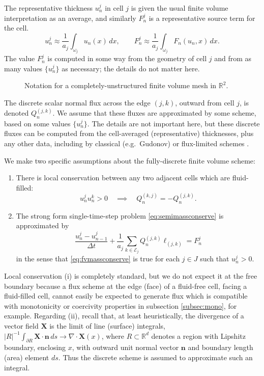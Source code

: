 \documentclass[final,leqno,onefignum,onetabnum]{siamltex1213bueler}
\newcommand\bn{\mathbf{n}}
\newcommand\bX{\mathbf{X}}
\newcommand{\Div}{\nabla\cdot}
\newcommand\RR{\mathbb{R}}
\begin{document}
The representative thickness $u_n^j$ in cell $j$ is given the usual finite volume interpretation as an average, and similarly $F_n^j$ is a representative source term for the cell.
\begin{equation}
u_n^j \approx \frac{1}{a_j} \int_{\omega_j} u_n(x)\,dx, \qquad F_n^j \approx \frac{1}{a_j} \int_{\omega_j} F_n(u_n,x)\,dx.  \label{eq:fvthickness}
\end{equation}
The value $F_n^j$ is computed in some way from the geometry of cell $j$ and from as many values $\{u_n^j\}$ as necessary; the details do not matter here.

\begin{figure}[ht]
\begin{center}

\end{center}
\caption{Notation for a completely-unstructured finite volume mesh in $\RR^2$.}
\label{fig:fvmesh-notation}
\end{figure}

The discrete scalar normal flux across the edge $(j,k)$, outward from cell $j$, is denoted $Q_n^{(j,k)}$.  We assume that these fluxes are approximated by some scheme, based on some values $\{u_n^j\}$.  The details are not important here, but these discrete fluxes can be computed from the cell-averaged (representative) thicknesses, plus any other data, including by classical (e.g.~Gudonov) or flux-limited schemes \cite{LeVeque2002}.

We make two specific assumptions about the fully-discrete finite volume scheme:\begin{enumerate}
\item There is local conservation between any two adjacent cells which are fluid-filled:
\begin{equation}
  u_n^j u_n^k > 0 \quad \implies \quad Q_n^{(k,j)}=-Q_n^{(j,k)}.  \label{eq:fvlocalconservation}
\end{equation}
\item The strong form single-time-step problem \eqref{eq:semimassconserve} is approximated by
\begin{equation}
\frac{u_n^j - u_{n-1}^j}{\Delta t} + \frac{1}{a_j} \sum_{k\in \mathcal{E}_j} Q_n^{(j,k)} \ell_{(j,k)} = F_n^j \label{eq:fvmassconserve}
\end{equation}
in the sense that \eqref{eq:fvmassconserve} is true for each $j\in J$ such that $u_n^j > 0$.
\end{enumerate}

Local conservation (i) is completely standard, but we do not expect it at the free boundary because a flux scheme at the edge (face) of a fluid-free cell, facing a fluid-filled cell, cannot easily be expected to generate flux which is compatible with monotonicity or coercivity properties in subsection \ref{subsec:mono}, for example.  Regarding (ii), recall that, at least heuristically, the divergence of a vector field $\bX$ is the limit of line (surface) integrals, $|R|^{-1} \int_{\partial R} \bX\cdot \bn\,ds \to \Div \bX(x)$, where $R\subset \RR^d$ denotes a region with Lipshitz boundary, enclosing $x$, with outward unit normal vector $\bn$ and boundary length (area) element $ds$.  Thus the discrete scheme is assumed to approximate such an integral. 
\end{document}
